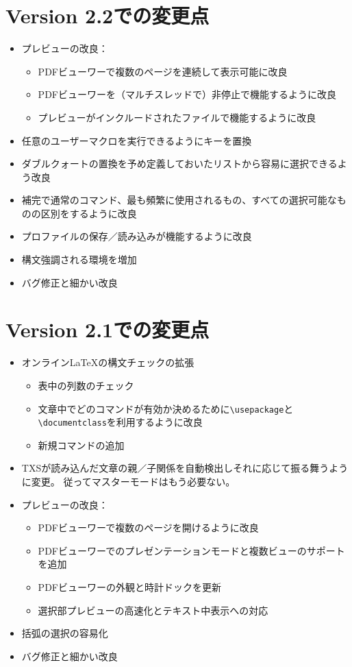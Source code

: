 \section{Version 2.2での変更点}

\begin{itemize}
\item
  プレビューの改良：

  \begin{itemize}
  \item
    PDFビューワーで複数のページを連続して表示可能に改良
  \item
    PDFビューワーを（マルチスレッドで）非停止で機能するように改良
  \item
    プレビューがインクルードされたファイルで機能するように改良
  \end{itemize}
\item
  任意のユーザーマクロを実行できるようにキーを置換
\item
  ダブルクォートの置換を予め定義しておいたリストから容易に選択できるよう改良
\item
  補完で通常のコマンド、最も頻繁に使用されるもの、すべての選択可能なものの区別をするように改良
\item
  プロファイルの保存／読み込みが機能するように改良
\item
  構文強調される環境を増加
\item
  バグ修正と細かい改良
\end{itemize}

\section{Version 2.1での変更点}

\begin{itemize}
\item
  オンラインLaTeXの構文チェックの拡張

  \begin{itemize}
  \item
    表中の列数のチェック
  \item
    文章中でどのコマンドが有効か決めるために\verb+\usepackage+と
    \verb+\documentclass+を利用するように改良
  \item
    新規コマンドの追加
  \end{itemize}
\item
  TXSが読み込んだ文章の親／子関係を自動検出しそれに応じて振る舞うように変更。
  従ってマスターモードはもう必要ない。
\item
  プレビューの改良：

  \begin{itemize}
  \item
    PDFビューワーで複数のページを開けるように改良
  \item
    PDFビューワーでのプレゼンテーションモードと複数ビューのサポートを追加
  \item
    PDFビューワーの外観と時計ドックを更新
  \item
    選択部プレビューの高速化とテキスト中表示への対応
  \end{itemize}
\item
  括弧の選択の容易化
\item
  バグ修正と細かい改良
\end{itemize}

